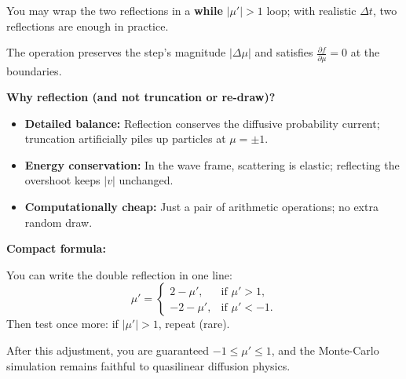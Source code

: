 \begin{tcolorbox}[colframe=black, colback=white, title=Why Reflection (and not Truncation or Redraw?)]

You may wrap the two reflections in a \textbf{while} \( |\mu'| > 1 \) loop; with realistic \( \Delta t \), two reflections are enough in practice.

The operation preserves the step's magnitude \( |\Delta \mu| \) and satisfies \( \frac{\partial f}{\partial \mu} = 0 \) at the boundaries.

\bigskip

\textbf{Why reflection (and not truncation or re-draw)?}
\begin{itemize}
    \item \textbf{Detailed balance:} Reflection conserves the diffusive probability current; truncation artificially piles up particles at \( \mu = \pm 1 \).
    \item \textbf{Energy conservation:} In the wave frame, scattering is elastic; reflecting the overshoot keeps \( |v| \) unchanged.
    \item \textbf{Computationally cheap:} Just a pair of arithmetic operations; no extra random draw.
\end{itemize}

\bigskip

\textbf{Compact formula:}

You can write the double reflection in one line:
\[
\mu' =
\begin{cases}
2 - \mu', & \text{if } \mu' > 1, \\
-2 - \mu', & \text{if } \mu' < -1.
\end{cases}
\]
Then test once more: if \( |\mu'| > 1 \), repeat (rare).

\bigskip

After this adjustment, you are guaranteed \( -1 \leq \mu' \leq 1 \), and the Monte-Carlo simulation remains faithful to quasilinear diffusion physics.

\end{tcolorbox}

